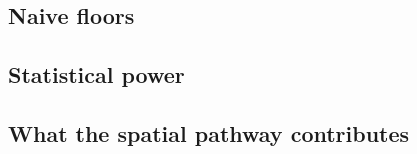 \documentclass[final,1p,times]{elsarticle}
\begin{document}
\subsection{Naive floors}
\label{sec:results-floors}


\subsection{Statistical power}
\label{sec:results-power}


\subsection{What the spatial pathway contributes}
\label{sec:results-ablation}


\end{document}
